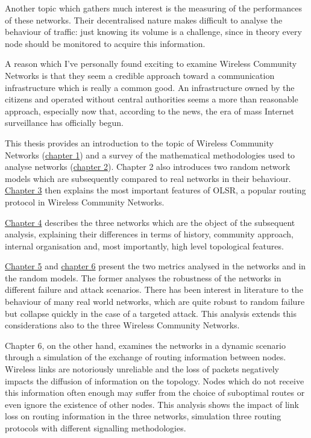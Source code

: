 \documentclass[a4paper,11pt,twoside,openleft]{memoir}
\begin{document}
Another topic which gathers much interest is the measuring of the performances
of these networks. Their decentralised nature makes difficult to analyse
the behaviour of traffic: just knowing its volume is a challenge, since in
theory every node should be monitored to acquire this information.

A reason which I've personally found exciting to examine Wireless Community
Networks is that they seem a credible approach toward a communication
infrastructure which is really a common good. An infrastructure owned by the
citizens and operated without central authorities seems a more than reasonable
approach, especially now that, according to the news, the era of mass Internet
surveillance has officially begun.

This thesis provides an introduction to the topic of Wireless Community Networks
(\hyperref[wireless-community-networks]{chapter 1})
and a survey of the mathematical methodologies used to analyse networks
(\hyperref[network-topology-and-graphs]{chapter 2}).
Chapter 2 also introduces two random network models which are subsequently
compared to real networks in their behaviour.
\hyperref[olsr-survey]{Chapter 3} then explains the most important 
features of OLSR, a popular routing protocol in Wireless Community Networks.

\hyperref[the-networks]{Chapter 4} describes the three networks which are
the object of the subsequent analysis, explaining their differences in terms
of history, community approach, internal organisation and, most importantly,
high level topological features.

\hyperref[robustness-analysis]{Chapter 5} and
\hyperref[message-propagation-analysis]{chapter 6} present the two metrics
analysed in the networks and in the random models.
The former analyses the robustness of the networks in different failure and
attack scenarios. There has been interest in literature to the behaviour
of many real world networks, which are quite robust to random failure but
collapse quickly in the case of a targeted attack. This analysis
extends this considerations also to the three Wireless Community Networks.

Chapter 6, on the other hand, examines the networks in a dynamic scenario
through a simulation of the exchange of routing information between nodes.
Wireless links are notoriously unreliable and the loss of packets negatively
impacts the diffusion of information on the topology.
Nodes which do not receive this information often enough may suffer from the
choice of suboptimal routes or even ignore the existence of other nodes.
This analysis shows the impact of link loss on routing information
in the three networks, simulation three routing protocols with different
signalling methodologies.
\end{document}
